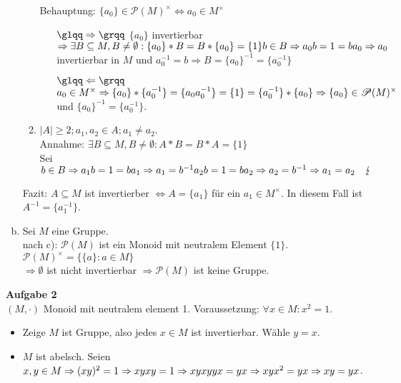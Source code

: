 \documentclass{article}
\begin{document}
\begin{enumerate}[a)]
\begin{enumerate}[1.{Fall}]
Behauptung: $\{a_0\} \in \mathscr{P}(M)^\times \Leftrightarrow a_0 \in M^\times$
\begin{itemize}
\item[$\glqq\Rightarrow\grqq$ ]$\{a_0\}$ invertierbar $\Rightarrow\exists B\subseteq M, B\neq\emptyset : \{a_0\}*B = B*\{a_0\} = \{1\}\\
b\in B \Rightarrow a_0b = 1 = ba_0\Rightarrow a_0$ invertierbar in $M$ und $a_0^{-1} = b \Rightarrow B = \{a_0\}^{-1} = \{a_0^{-1}\}$
\item[$\glqq\Leftarrow\grqq$ ] $a_0 \in M^\times\\
\Rightarrow\{a_0\}*\{a_0^{-1}\} = \{a_0a_0^{-1}\} = \{1\} = \{a_0^{-1}\}*\{a_0\}\\
\Rightarrow \{a_0\} \in\mathscr{P}(M)^\times$ und $\{a_0\}^{-1} = \{a_0^{-1}\}$.
\end{itemize}
\item $|A| \geq 2; a_1,a_2\in A; a_1\neq a_2$.\\
Annahme: $\exists B\subseteq M, B\neq\emptyset : A*B = B*A = \{1\}$\\
Sei $b\in B \Rightarrow a_1b = 1 = ba_1 \Rightarrow a_1 = b^{-1}\\
a_2b = 1 = ba_2 \Rightarrow a_2 = b^{-1} \Rightarrow a_1 = a_2\quad\lightning$\\
\end{enumerate}
Fazit: $A\subseteq M$ ist invertierber $\Leftrightarrow A = \{a_1\}$ für ein $a_1\in M^\times$. In diesem Fall ist $A^{-1} = \{a_1^{-1}\}$.
\item Sei $M$ eine Gruppe.\\
nach c): $\mathscr{P}(M)$ ist ein Monoid mit neutralem Element $\{1\}$.\\
$\mathscr{P}(M)^\times = \{\{a\}:a \in M\}$\\
$\Rightarrow \emptyset$ ist nicht invertierbar $\Rightarrow \mathscr{P}(M)$ ist keine Gruppe.
\end{enumerate}

\textbf{Aufgabe 2}\\
$(M,\cdot )$ Monoid mit neutralem element 1. Voraussetzung: $\forall x\in M: x^2 = 1$.\\
\begin{itemize}
\item Zeige $M$ ist Gruppe, also jedes $x\in M$ ist invertierbar. Wähle $y=x$.
\item $M$ ist abelsch. Seien $x,y\in M \Rightarrow (xy)^2 = 1 \Rightarrow xyxy = 1 \Rightarrow xyxyyx = yx \Rightarrow xyx^2 = yx \\
\Rightarrow xy = yx$.\\
\end{itemize}
\end{document}

